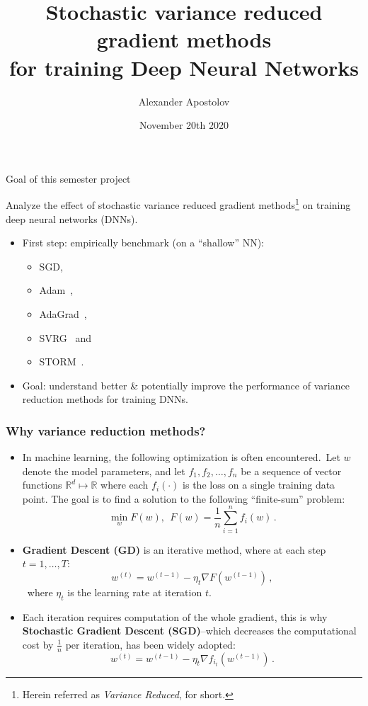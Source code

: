 \documentclass[10pt]{beamer}
\title{Stochastic variance reduced gradient methods \\for training Deep Neural Networks}
\author{Alexander Apostolov}
\institute {École Polytechnique Fédérale de Lausanne}
\date{November 20th 2020}
\begin{document}
\frame{\titlepage}


\begin{frame}{Goal of this semester project}

Analyze the effect of \alert{stochastic variance reduced gradient methods}\footnote{Herein referred as \textit{Variance Reduced},  for short. } on  training \alert{deep neural networks} (DNNs).
\newline
\begin{itemize}
    \item First step: empirically benchmark (on a ``shallow'' NN):
    \begin{itemize}
        \item SGD, 
        \item Adam~\citep{kingma2014adam}, 
        \item AdaGrad~\citep{john2011adagrad}, 
        \item SVRG~\citep{johnson2013accelerating} and 
        \item STORM~\citep{Cutkosky2019storm}.
    \end{itemize}
    \item Goal: understand better \& potentially improve the performance of variance reduction methods for training DNNs. 
\end{itemize}
    
\end{frame}

\begin{frame}
\frametitle{Why variance reduction methods?}
\begin{itemize}
    \item In machine learning, the following optimization is often encountered.\
    Let $w$ denote the model parameters, and let $f_1, f_2, \dots, f_n$ be a sequence of vector functions $\mathbb{R}^d \mapsto \mathbb{R}$ where each $f_i(\cdot)$ is the loss on a single training data point.
    The goal is to find a solution to the following ``finite-sum'' problem:
    $$\min_w F(w),~~F(w)=\frac{1}{n}\sum_{i=1}^n f_i(w)\,.$$
    \item \textbf{Gradient Descent (GD)} is an iterative method, where at each step $ t=1, \dots, T$:
    $$w^{(t)} = w^{(t-1)} - \eta_t \nabla F(w^{(t-1)}) \,,$$\
    where $\eta_t$ is the learning rate at iteration $t$.
    \item Each iteration requires computation of the whole gradient, this is why \textbf{Stochastic Gradient Descent (SGD)}--which decreases  the computational cost by $\frac{1}{n}$ per iteration, has been widely adopted:
    $$w^{(t)} = w^{(t-1)} -\eta_t \nabla f_{i_t}(w^{(t-1)})\,.$$
\end{itemize}
\end{frame}
\end{document}
